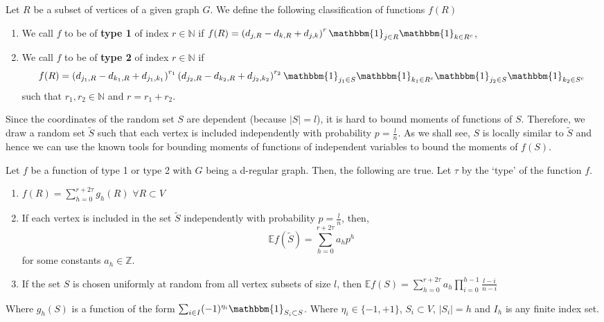 \documentclass[final,12pt]{colt2018}
\begin{document}
\begin{definition}
Let $R$ be a subset of vertices of a given graph $G$.
We define the following classification of functions $f(R)$
\begin{enumerate}
\item We call $f$ to be of \textbf{type 1} of index $r \in \mathbb{N}$ if $f(R) = \left(d_{j,R} - d_{k,R} + d_{j,k}\right)^r \mathbbm{1}_{j\in R}\mathbbm{1}_{k \in R^c}  $, 
\item We call $f$ to be of \textbf{type 2} of index $r  \in \mathbb{N}$ if $$f(R) = \left(d_{j_1,R} - d_{k_1,R} + d_{j_1,k_1}\right)^{r_1}\left(d_{j_2,R} - d_{k_2,R} + d_{j_2,k_2}\right)^{r_2} \mathbbm{1}_{j_1\in S}\mathbbm{1}_{k_1 \in R^c} \mathbbm{1}_{j_2\in S}\mathbbm{1}_{k_2 \in S^c}$$ such that $r_1, r_2 \in \mathbb{N}$ and  $r = r_1 + r_2$.
\end{enumerate}
\end{definition}

Since the coordinates of the random set $S$ are dependent (because $|S| = l$), it is hard to bound moments of functions of $S$. Therefore, we draw a random set $\tilde{S}$ such that each vertex is included independently with probability $p=\frac{l}{n}$. As we shall see, $S$ is locally similar to $\tilde{S}$ and hence we can use the known tools for bounding moments of functions of independent variables to bound the moments of $f(S)$.
\begin{lemma}
Let $f$ be a function of type 1 or type 2 with $G$ being a d-regular graph. Then, the following are true. Let $\tau$ by the `type' of the function $f$.
\begin{enumerate}
\item
$f(R) = \sum_{h = 0}^{r+2\tau} g_h(R)$ $\forall R \subset V$
\item
If each vertex is included in the set $\tilde{S}$ independently with probability $p = \frac{l}{n}$, then,
$$\mathbb{E}f\left(\tilde{S}\right)= \sum_{h=0}^{r+2\tau} a_h p^h$$
for some constants $a_h \in \mathbb{Z}$.
\item
If the set $S$ is chosen uniformly at random from all vertex subsets of size $l$, then
$\mathbb{E}f(S) = \sum_{h = 0}^{r+2\tau} a_h \prod_{i=0}^{h-1} \frac{l-i}{n-i}$
\end{enumerate}
Where $g_h(S)$ is a function of the form $\sum_{i\in I} (-1)^{\eta_i} \mathbbm{1}_{S_i \subset S }$. Where $\eta_i \in \{-1,+1\}$, $S_i \subset V$, $|S_i| = h$ and $I_h$ is any finite index set.
\label{poly_form}
\end{lemma}
\end{document}
